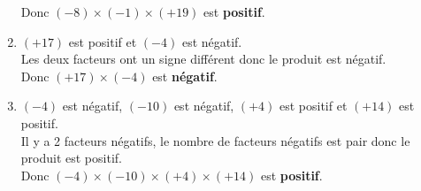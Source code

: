 \begin{corrige}
\begin{multicols}
\begin{enumerate}
                  Donc $ (-8) \times (-1) \times (+19) $ est {\bfseries \color[HTML]{f15929}positif}.
            \item $ (+17) $ est positif et $ (-4) $ est négatif.\\
                  Les deux facteurs ont un signe différent donc le produit est négatif.\\
                  Donc $ (+17) \times (-4) $ est {\bfseries \color[HTML]{f15929}négatif}.
            \item $ (-4) $ est négatif, $ (-10) $ est négatif, $ (+4) $ est positif et $ (+14) $ est positif.\\
                  Il y a 2 facteurs négatifs, le nombre de facteurs négatifs est pair donc le produit est positif.\\
                  Donc $ (-4) \times (-10) \times (+4) \times (+14) $ est {\bfseries \color[HTML]{f15929}positif}.
        \end{enumerate}
    \end{multicols}
\end{corrige}